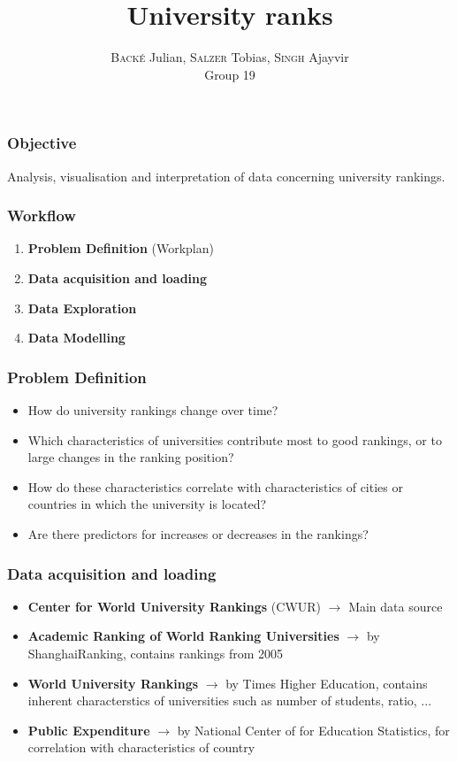 \documentclass[mathserif,notheorems,11pt]{beamer}
\title{\textbf{University ranks}}
\author{\textsc{Back\'{e}} Julian, \textsc{Salzer} Tobias, \textsc{Singh} Ajayvir\\
Group 19}
\date{}
\begin{document}
\maketitle
\linespread{1.2}


\begin{frame} 
\frametitle{Objective}
Analysis, visualisation and interpretation of data concerning university rankings.
\end{frame}

\begin{frame} 
\frametitle{Workflow}

\begin{enumerate}
\item \textbf{Problem Definition} (Workplan)

\item \textbf{Data acquisition and loading}

\item \textbf{Data Exploration}

\item \textbf{Data Modelling}
\end{enumerate}

\end{frame}

\begin{frame} 
\frametitle{Problem Definition}

\begin{itemize}
	\item How do university rankings change over time? 
	
	\item Which characteristics of universities contribute most to good rankings, or to large changes in the ranking position? 
	
	\item How do these characteristics correlate with characteristics of cities or countries in which the university is
	located? 
	
	\item Are there predictors for increases or decreases in the rankings?
\end{itemize}

\end{frame}

\begin{frame} 
\frametitle{Data acquisition and loading}
\begin{itemize}
	\item \textbf{Center for World University Rankings} (CWUR) $\rightarrow$ Main data source
	\item \textbf{Academic Ranking of World Ranking Universities} $\rightarrow$ by ShanghaiRanking, contains rankings from 2005
	\item \textbf{World University Rankings } $\rightarrow$ by Times Higher Education, contains inherent characterstics of universities such as number of students, ratio, ...
	\item \textbf{Public Expenditure} $\rightarrow$ by National Center of for Education Statistics, for correlation with characteristics of country

\end{itemize}

\end{frame}
\end{document}
